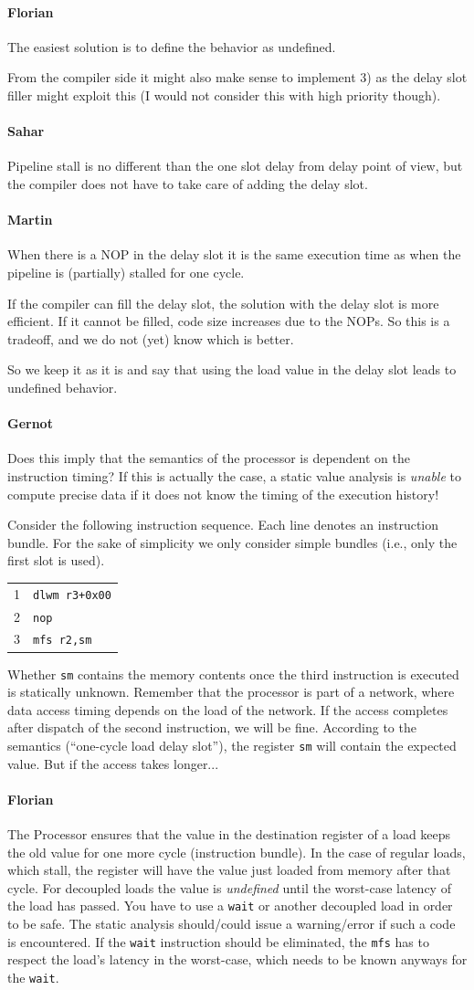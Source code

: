 \documentclass{IEEEtran}
\newcommand{\comment}[3]{\paragraph*{\textbf{#1}}{\color{#3}#2}}
\newcommand{\martin}[1]{\comment{Martin}{#1}{Blue}}
\newcommand{\gebhard}[1]{\comment{Gernot}{#1}{RedOrange}}
\newcommand{\fb}[1]{\comment{Florian}{#1}{Emerald}}
\newcommand{\sahar}[1]{\comment{Sahar}{#1}{Green}}
\begin{document}
\fb{The easiest solution is to define the behavior as undefined.

From the compiler side it might also make sense to implement 3) as
the delay slot filler might exploit this (I would not consider this
with high priority though).}

\sahar{Pipeline stall is no different than the one slot delay from delay point of view, but the compiler does not have to take care of adding the delay slot.}

\martin{When there is a NOP in the delay slot it is the same execution time as when the pipeline is (partially) stalled for one cycle.

If the compiler can fill the delay slot, the solution with the delay slot is more efficient. If it cannot be filled, code size increases due to the NOPs. So this is a tradeoff, and we do not (yet) know which is better.

So we keep it as it is and say that using the load value in the delay slot leads to undefined behavior.}


\gebhard{Does this imply that the semantics of the processor is dependent on the instruction timing?
If this is actually the case, a static value analysis is \emph{unable} to compute precise data if it does not know the timing of the execution history!

Consider the following instruction sequence.
Each line denotes an instruction bundle.
For the sake of simplicity we only consider simple bundles (i.e., only the first slot is used).

\begin{tabular}{cl}
\hline
1 & \texttt{dlwm r3+0x00} \\
2 & \texttt{nop}          \\
3 & \texttt{mfs r2,sm}  \\
\hline
\end{tabular}

Whether \texttt{sm} contains the memory contents once the third instruction is executed is statically unknown.
Remember that the processor is part of a network, where data access timing depends on the load of the network.
If the access completes after dispatch of the second instruction, we will be fine.
According to the semantics (``one-cycle load delay slot''), the register \texttt{sm} will contain the expected value.
But if the access takes longer...}

\fb{
The Processor ensures that the value in the destination register of a load keeps
the old value for one more cycle (instruction bundle). In the case of regular
loads, which stall, the register will have the value just loaded from memory
after that cycle. For decoupled loads the value is \emph{undefined} until the
worst-case latency of the load has passed. You have to use a \texttt{wait} or
another decoupled load in order to be safe. The static analysis should/could
issue a warning/error if such a code is encountered. If the \texttt{wait}
instruction should be eliminated, the \texttt{mfs} has to respect the load's
latency in the worst-case, which needs to be known anyways for the
\texttt{wait}.
}
\end{document}

